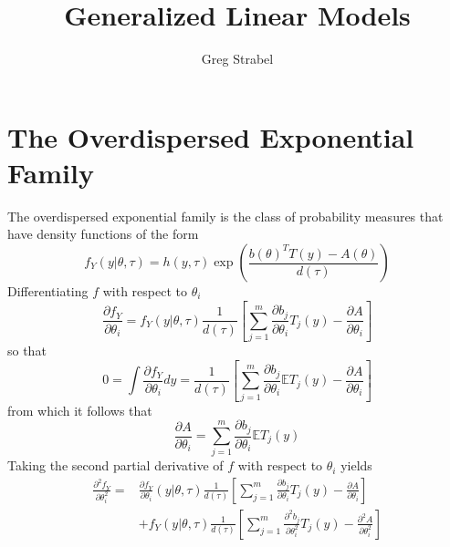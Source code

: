 \documentclass[11pt]{article}
\author{Greg Strabel}
\title{Generalized Linear Models}
\begin{document}
\maketitle
\section{The Overdispersed Exponential Family}
The overdispersed exponential family is the class of probability measures that have density functions of the form
\begin{equation}
f_Y \left( y | \theta, \tau \right) = h \left( y , \tau \right) \exp \left( \frac{b \left( \theta \right)^T T \left( y \right) - A \left( \theta \right)}{d \left( \tau \right)} \right)
\end{equation}
Differentiating $f$ with respect to $\theta_i$
\begin{equation}
\frac{\partial f_Y}{\partial \theta_i} = f_Y \left( y | \theta, \tau \right) \frac{1}{d \left( \tau \right)} \left[ \sum_{j=1}^m \frac{\partial b_j}{\partial \theta_i} T_j \left( y \right) - \frac{\partial A}{\partial \theta_i} \right]
\end{equation}
so that
\begin{equation}
0 = \int \frac{\partial f_Y}{\partial \theta_i} dy = \frac{1}{d \left( \tau \right)} \left[ \sum_{j=1}^m \frac{\partial b_j}{\partial \theta_i} \mathbb{E} T_j \left( y \right) - \frac{\partial A}{\partial \theta_i} \right]
\end{equation}
from which it follows that
\begin{equation} \label{mean}
\frac{\partial A}{\partial \theta_i} = \sum_{j=1}^m \frac{\partial b_j}{\partial \theta_i} \mathbb{E} T_j \left( y \right)
\end{equation}
Taking the second partial derivative of $f$ with respect to $\theta_i$ yields
\begin{equation}
\begin{split}
\frac{\partial^2 f_Y}{\partial \theta_i^2} = & \frac{\partial f_Y}{\partial \theta_i} \left( y | \theta, \tau \right) \frac{1}{d \left( \tau \right)} \left[ \sum_{j=1}^m \frac{\partial b_j}{\partial \theta_i} T_j \left( y \right) - \frac{\partial A}{\partial \theta_i} \right] \\
&+ f_Y \left( y | \theta, \tau \right) \frac{1}{d \left( \tau \right)} \left[ \sum_{j=1}^m \frac{\partial^2 b_j}{\partial \theta_i^2} T_j \left( y \right) - \frac{\partial^2 A}{\partial \theta_i^2} \right]
\end{split}
\end{equation}
\end{document}
